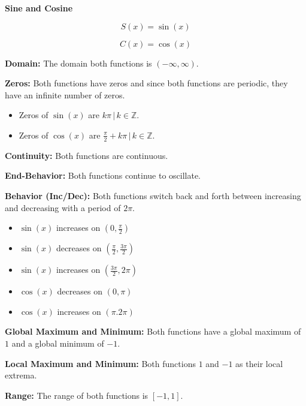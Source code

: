 \documentclass{ximera}
\begin{document}
\begin{explanation} \textbf{\textcolor{red!75!green}{Sine and Cosine}} 


\[ S(x) = \sin(x)  \]

\[ C(x) = \cos(x)  \]



\textbf{Domain:} The domain both functions is $(-\infty, \infty)$.

\textbf{Zeros:} Both functions have zeros and since both functions are periodic, they have an infinite number of zeros.


\begin{itemize}
\item Zeros of $\sin(x)$ are ${k \pi \, | \, k \in \mathbb{Z}}$.
\item Zeros of $\cos(x)$ are ${\frac{\pi}{2} + k \pi\, | \, k \in \mathbb{Z}}$.
\end{itemize}


\textbf{Continuity:} Both functions are continuous.



\textbf{End-Behavior:} Both functions continue to oscillate.






\textbf{Behavior (Inc/Dec):} Both functions switch back and forth between increasing and decreasing with a period of $2\pi$.

\begin{itemize}
\item $\sin(x)$ increases on $\left(0, \frac{\pi}{2} \right)$
\item $\sin(x)$ decreases on $\left(\frac{\pi}{2}, \frac{3\pi}{2} \right)$
\item $\sin(x)$ increases on $\left(\frac{3\pi}{2}, 2\pi \right)$
\end{itemize}

\begin{itemize}
\item $\cos(x)$ decreases on $(0, \pi)$
\item $\cos(x)$ increases on $(\pi. 2\pi)$
\end{itemize}







\textbf{Global Maximum and Minimum:} Both functions have a global maximum of $1$ and a global minimum of $-1$.




\textbf{Local Maximum and Minimum:}  Both functions $1$ and $-1$ as their local extrema.




\textbf{Range:} The range of both functions is $[-1, 1]$.

\end{explanation}
\end{document}
